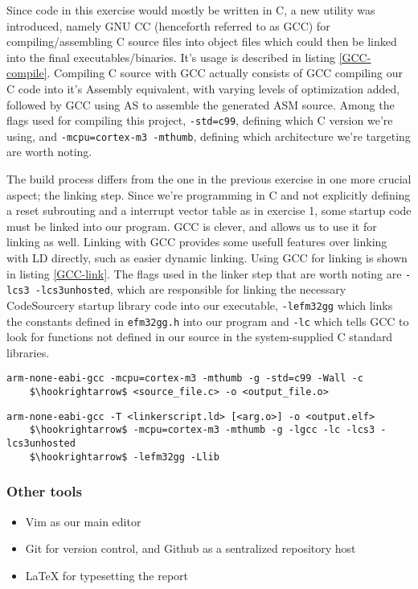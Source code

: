 Since code in this exercise would mostly be written in C, a new utility was introduced, namely GNU CC (henceforth referred to as GCC) for compiling/assembling C source files into object files which could then be linked into the final executables/binaries. It's usage is described in listing \ref{GCC-compile}. Compiling C source with GCC actually consists of GCC compiling our C code into it's Assembly equivalent, with varying levels of optimization added, followed by GCC using AS to assemble the generated ASM source. Among the flags used for compiling this project, \texttt{-std=c99}, defining which C version we're using, and \texttt{-mcpu=cortex-m3 -mthumb}, defining which architecture we're targeting are worth noting.

The build process differs from the one in the previous exercise in one more crucial aspect; the linking step. Since we're programming in C and not explicitly defining a reset subrouting and a interrupt vector table as in exercise 1, some startup code must be linked into our program. GCC is clever, and allows us to use it for linking as well. Linking with GCC provides some usefull features over linking with LD directly, such as easier dynamic linking. Using GCC for linking is shown in listing \ref{GCC-link}. The flags used in the linker step that are worth noting are \texttt{-lcs3 -lcs3unhosted}, which are responsible for linking the necessary CodeSourcery startup library code into our executable, \texttt{-lefm32gg} which links the constants defined in \texttt{efm32gg.h} into our program and \texttt{-lc} which tells GCC to look for functions not defined in our source in the system-supplied C standard libraries.

\begin{lstlisting}[label=GCC-compile, caption=GCC compilation usage, mathescape]
arm-none-eabi-gcc -mcpu=cortex-m3 -mthumb -g -std=c99 -Wall -c
    $\hookrightarrow$ <source_file.c> -o <output_file.o>
\end{lstlisting}

\begin{lstlisting}[label=GCC-link, caption=GCC linking usage, mathescape]
arm-none-eabi-gcc -T <linkerscript.ld> [<arg.o>] -o <output.elf>
    $\hookrightarrow$ -mcpu=cortex-m3 -mthumb -g -lgcc -lc -lcs3 -lcs3unhosted
    $\hookrightarrow$ -lefm32gg -Llib
\end{lstlisting}

\subsubsection{Other tools}

\begin{itemize}
\label{other-tools}
\item Vim as our main editor
\item Git for version control, and Github as a sentralized repository host
\item \LaTeX{} for typesetting the report
\end{itemize}
